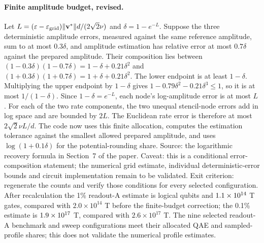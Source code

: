 \documentclass[11pt,a4paper]{article}
\begin{document}
\paragraph{Finite amplitude budget, revised.}
Let $L=(\varepsilon-\varepsilon_{\rm grid})\|\mathbf v^*\|d/(2\sqrt2\nu)$
and $\delta=1-e^{-L}$. Suppose the three deterministic amplitude errors,
measured against the same reference amplitude, sum to at most $0.3\delta$,
and amplitude estimation has relative error at most $0.7\delta$ against
the prepared amplitude. Their composition lies between
$(1-0.3\delta)(1-0.7\delta)=1-\delta+0.21\delta^2$ and
$(1+0.3\delta)(1+0.7\delta)=1+\delta+0.21\delta^2$. The lower endpoint is
at least $1-\delta$. Multiplying the upper endpoint by $1-\delta$ gives
$1-0.79\delta^2-0.21\delta^3\le1$, so it is at most $1/(1-\delta)$.
Since $1-\delta=e^{-L}$, each node's log-amplitude error is at most $L$.
For each of the two rate components, the two unequal stencil-node errors add
in log space and are bounded by $2L$. The Euclidean rate error is therefore
at most $2\sqrt2\nu L/d$. The code now uses this finite allocation, computes
the estimation tolerance against the smallest allowed prepared amplitude, and
uses $\log(1+0.1\delta)$ for the potential-rounding share. Source: the
logarithmic recovery formula in Section~7 of the paper. Caveat: this is a
conditional error-composition statement; the numerical grid estimate,
individual deterministic-error bounds and circuit implementation remain to
be validated. Exit criterion: regenerate the counts and verify those
conditions for every selected configuration. After recalculation the 1\%
readout-A estimate is \QAOne{} logical qubits and $1.1\times10^{14}$ T gates, compared
with $2.0\times10^{14}$ T before the finite-budget correction; the 0.1\%
estimate is $1.9\times10^{17}$ T, compared with $2.6\times10^{17}$ T. The nine selected
readout-A benchmark and sweep configurations meet their allocated QAE and
sampled-profile shares; this does not validate the numerical profile estimates.
\end{document}
